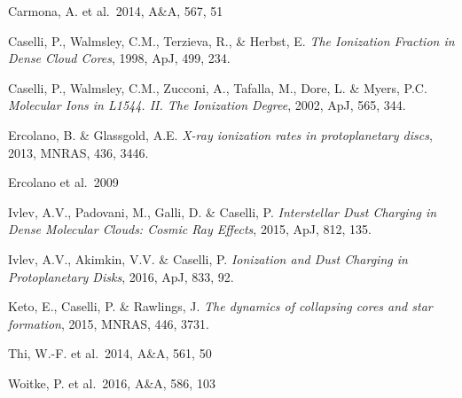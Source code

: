 \documentclass[10pt,fleqn,twoside]{article}
\begin{document}
\begin{literature}
\item Carmona, A. et al.\ 2014, A\&A, 567, 51 
\item Caselli, P., Walmsley, C.M., Terzieva, R., \& Herbst, E. {\em The
    Ionization Fraction in Dense Cloud Cores}, 1998, ApJ, 499, 234.
\item Caselli, P., Walmsley, C.M., Zucconi, A., Tafalla, M., Dore, L. \&
  Myers, P.C.  {\em Molecular Ions in L1544. II. The Ionization Degree},
  2002, ApJ, 565, 344.
\item Ercolano, B. \& Glassgold, A.E. {\em X-ray ionization rates in
    protoplanetary discs}, 2013, MNRAS, 436, 3446.
\item Ercolano et al.\ 2009 
\item Ivlev, A.V., Padovani, M., Galli, D. \& Caselli, P. {\em Interstellar
    Dust Charging in Dense Molecular Clouds: Cosmic Ray Effects},
  2015, ApJ, 812, 135.
\item Ivlev, A.V., Akimkin, V.V. \& Caselli, P. {\em Ionization and Dust
    Charging in Protoplanetary Disks}, 2016, ApJ, 833, 92.
\item Keto, E., Caselli, P. \& Rawlings, J. {\em The dynamics of collapsing
    cores and star formation}, 2015, MNRAS, 446, 3731.
\item Thi, W.-F. et al.\ 2014, A\&A, 561, 50 
\item Woitke, P. et al.\ 2016, A\&A, 586, 103 
\end{literature}

% 
% 
% 
% 
% 
% 
% 
\end{document}
